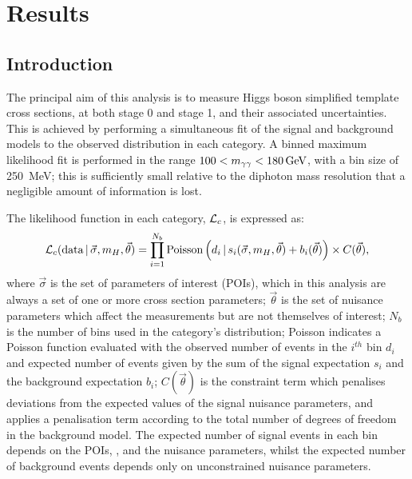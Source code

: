 \chapter{Results}
\label{chap:results}

\section{Introduction}

The principal aim of this analysis is to measure Higgs boson simplified template cross sections, 
at both stage 0 and stage 1, and their associated uncertainties.
This is achieved by performing a simultaneous fit of the signal and background models 
to the observed \mgg distribution in each category.
A binned maximum likelihood fit is performed in the range $100 < m_{\gamma\gamma} < \SI{180}{GeV}$, 
with a bin size of \SI{250}{MeV};
this is sufficiently small relative to the diphoton mass resolution 
that a negligible amount of information is lost. %

The likelihood function in each category, $\mathcal{L}_c$, is expressed as:
\begin{equation}
\mathcal{L}_c(\textrm{data}\,|\,\vec{\sigma},m_{H},\vec{\theta}) = \prod^{N_b}_{i=1} \textrm{Poisson}\left( d_i\,|\, 
                  s_i(\vec{\sigma},m_{H},\vec{\theta}) + b_i(\vec{\theta}) \right) \times C(\vec{\theta}),
\end{equation}
where $\vec{\sigma}$ is the set of parameters of interest (POIs), 
which in this analysis are always a set of one or more cross section parameters;
$\vec{\theta}$ is the set of nuisance parameters which affect the measurements 
but are not themselves of interest;
$N_b$ is the number of bins used in the category's \mgg distribution;
Poisson indicates a Poisson function evaluated with the observed number of events 
in the $i^{\mathit{th}}$ bin $d_i$ 
and expected number of events given by the sum of the signal expectation $s_i$ 
and the background expectation $b_i$;
$C(\vec{\theta})$ is the constraint term which penalises deviations 
from the expected values of the signal nuisance parameters,
and applies a penalisation term according to 
the total number of degrees of freedom in the background model.
The expected number of signal events in each bin depends on the POIs, \mH, 
and the nuisance parameters, 
whilst the expected number of background events depends only on unconstrained nuisance parameters.

